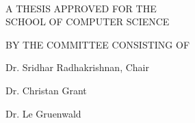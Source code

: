 \thispagestyle{empty}

\vspace*{0.75in}

\begin{center}

\MakeUppercase{\mytitle{}} \\

\vspace{0.56in}

A THESIS APPROVED FOR THE \\
SCHOOL OF COMPUTER SCIENCE \\

\vspace{1.9in}

BY THE COMMITTEE CONSISTING OF \\
\end{center}

\vspace{0.5in}

\begin{flushright}
Dr. Sridhar Radhakrishnan, Chair \\

\vspace{0.25in}

Dr. Christan Grant \\

\vspace{0.25in}

Dr. Le Gruenwald \\

\end{flushright}

\pagebreak
